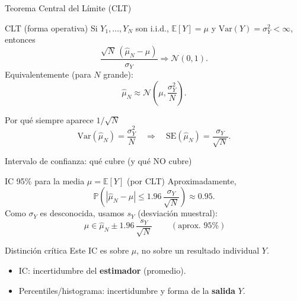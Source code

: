 \documentclass[aspectratio=1610, 9pt]{beamer}
\begin{document}
\begin{frame}{Teorema Central del Límite (CLT)}
\begin{block}{CLT (forma operativa)}
Si $Y_1,\dots,Y_N$ son i.i.d., $\mathbb E[Y]=\mu$ y $\mathrm{Var}(Y)=\sigma_Y^2<\infty$, entonces
\[
\frac{\sqrt{N}\,(\widehat\mu_N-\mu)}{\sigma_Y}\Rightarrow \mathcal N(0,1).
\]
Equivalentemente (para $N$ grande):
\[
\widehat\mu_N \approx \mathcal N\!\left(\mu,\frac{\sigma_Y^2}{N}\right).
\]
\end{block}

\begin{block}{Por qué siempre aparece $1/\sqrt{N}$}
\[
\mathrm{Var}(\widehat\mu_N)=\frac{\sigma_Y^2}{N}\quad\Rightarrow\quad
\mathrm{SE}(\widehat\mu_N)=\frac{\sigma_Y}{\sqrt{N}}.
\]
\end{block}

\end{frame}

\begin{frame}{Intervalo de confianza: qué cubre (y qué NO cubre)}
\begin{block}{IC 95\% para la media $\mu=\mathbb E[Y]$ (por CLT)}
Aproximadamente,
\[
\mathbb P\!\left(\left|\widehat\mu_N-\mu\right|\le 1.96\,\frac{\sigma_Y}{\sqrt{N}}\right)\approx 0.95.
\]
Como $\sigma_Y$ es desconocida, usamos $s_Y$ (desviación muestral):
\[
\boxed{\ \mu \in \widehat\mu_N \pm 1.96\,\frac{s_Y}{\sqrt{N}}\ }\qquad (\text{aprox. 95\%})
\]
\end{block}

\begin{alertblock}{Distinción crítica}
Este IC es sobre \textbf{$\mu$}, no sobre un resultado individual $Y$.
\begin{itemize}
  \item IC: incertidumbre del \textbf{estimador} (promedio).
  \item Percentiles/histograma: incertidumbre y forma de la \textbf{salida} $Y$.
\end{itemize}
\end{alertblock}
\end{frame}
\end{document}

